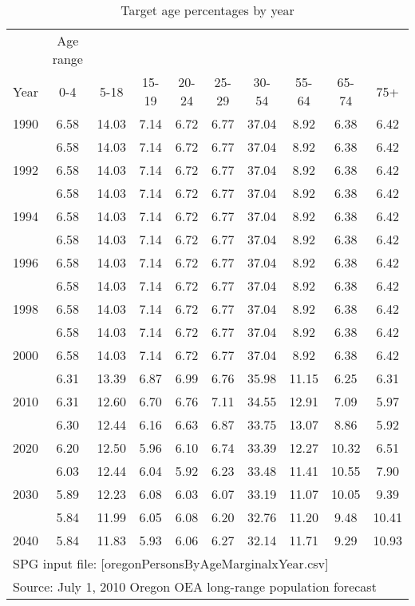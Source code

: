 \begin{table}[!t]  %
\centering
\caption{Target age percentages by year}\label{tab:age_example}
\begin{tabular}{cccccccccc}
\hline
 & Age range \\
Year & 0-4 & 5-18 & 15-19 & 20-24 & 25-29 & 30-54 & 55-64 & 65-74 & 75+ \\
\hline
1990 & 6.58 & 14.03 & 7.14 & 6.72 & 6.77 & 37.04 & 8.92 & 6.38 & 6.42 \\
\gray 1991 & 6.58 & 14.03 & 7.14 & 6.72 & 6.77 & 37.04 & 8.92 & 6.38 & 6.42 \\
1992 & 6.58 & 14.03 & 7.14 & 6.72 & 6.77 & 37.04 & 8.92 & 6.38 & 6.42 \\
\gray 1993 & 6.58 & 14.03 & 7.14 & 6.72 & 6.77 & 37.04 & 8.92 & 6.38 & 6.42 \\
1994 & 6.58 & 14.03 & 7.14 & 6.72 & 6.77 & 37.04 & 8.92 & 6.38 & 6.42 \\
\gray 1995 & 6.58 & 14.03 & 7.14 & 6.72 & 6.77 & 37.04 & 8.92 & 6.38 & 6.42 \\
1996 & 6.58 & 14.03 & 7.14 & 6.72 & 6.77 & 37.04 & 8.92 & 6.38 & 6.42 \\
\gray 1997 & 6.58 & 14.03 & 7.14 & 6.72 & 6.77 & 37.04 & 8.92 & 6.38 & 6.42 \\
1998 & 6.58 & 14.03 & 7.14 & 6.72 & 6.77 & 37.04 & 8.92 & 6.38 & 6.42 \\
\gray 1999 & 6.58 & 14.03 & 7.14 & 6.72 & 6.77 & 37.04 & 8.92 & 6.38 & 6.42 \\
2000 & 6.58 & 14.03 & 7.14 & 6.72 & 6.77 & 37.04 & 8.92 & 6.38 & 6.42 \\
\gray 2005 & 6.31 & 13.39 & 6.87 & 6.99 & 6.76 & 35.98 & 11.15 & 6.25 & 6.31 \\
2010 & 6.31 & 12.60 & 6.70 & 6.76 & 7.11 & 34.55 & 12.91 & 7.09 & 5.97 \\
\gray 2015 & 6.30 & 12.44 & 6.16 & 6.63 & 6.87 & 33.75 & 13.07 & 8.86 & 5.92 \\
2020 & 6.20 & 12.50 & 5.96 & 6.10 & 6.74 & 33.39 & 12.27 & 10.32 & 6.51 \\
\gray 2025 & 6.03 & 12.44 & 6.04 & 5.92 & 6.23 & 33.48 & 11.41 & 10.55 & 7.90 \\
2030 & 5.89 & 12.23 & 6.08 & 6.03 & 6.07 & 33.19 & 11.07 & 10.05 & 9.39 \\
\gray 2035 & 5.84 & 11.99 & 6.05 & 6.08 & 6.20 & 32.76 & 11.20 & 9.48 & 10.41 \\
2040 & 5.84 & 11.83 & 5.93 & 6.06 & 6.27 & 32.14 & 11.71 & 9.29 & 10.93 \\
\hline
\multicolumn{10}{l}{SPG input file: [oregonPersonsByAgeMarginalxYear.csv]} \\
\multicolumn{10}{l}{Source:  July 1, 2010 Oregon OEA long-range population forecast} \\
\end{tabular}
\end{table}


